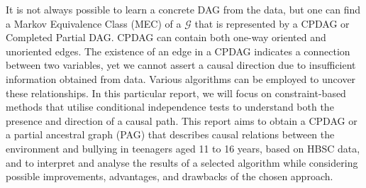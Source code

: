 \documentclass[main.tex]{subfiles}
\begin{document}
It is not always possible to learn a concrete DAG from the data, but one can find a Markov Equivalence Class (MEC) of a $\mathcal{G}$ that is represented by a CPDAG or Completed Partial DAG. CPDAG can contain both one-way oriented and unoriented edges. The existence of an edge in a CPDAG indicates a connection between two variables, yet we cannot assert a causal direction due to insufficient information obtained from data. Various algorithms can be employed to uncover these relationships. In this particular report, we will focus on constraint-based methods that utilise conditional independence tests to understand both the presence and direction of a causal path. This report aims to obtain a CPDAG or a partial ancestral graph (PAG) that describes causal relations between the environment and bullying in teenagers aged 11 to 16 years, based on HBSC data, and to interpret and analyse the results of a selected algorithm while considering possible improvements, advantages, and drawbacks of the chosen approach. 


\end{document}
